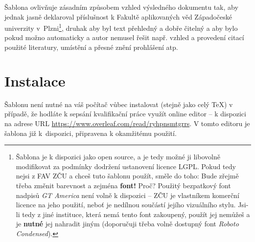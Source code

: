 \documentclass[czech, ing, kiv, he, iso690alph]{fasthesis}
\begin{document}
Šablona ovlivňuje zásadním způsobem vzhled výsledného dokumentu tak, aby jednak jasně deklaroval příslušnost k Fakultě aplikovaných věd Západočeské univerzity v~Plzni\footnote{Šablona je k dispozici jako open source, a je tedy možné ji libovolně modifikovat za podmínky dodržení ustanovení licence LGPL. Pokud tedy nejsi z FAV ZČU a chceš tuto šablonu použít, směle do toho: Bude zřejmě třeba změnit barevnost a zejména \textbf{font!} Proč? Použitý bezpatkový font nadpisů \emph{GT America} není volně k dispozici -- ZČU je vlastníkem komerční licence na jeho použití, neboť je nedílnou součástí jejího vizuálního stylu. Jsi-li tedy z jiné instituce, která nemá tento font zakoupený, použít jej nemůžeš a je \textbf{nutné} jej nahradit jiným (doporučuji třeba volně dostupný font \emph{Roboto Condensed}).}, druhak aby byl text přehledný a dobře čitelný a aby bylo pokud možno  automaticky a autor nemusel řešit např. vzhled a provedení citací použité literatury, umístění a přesné znění prohlášení atp.
%
%
%
\section{Instalace}
Šablonu není nutné  na váš počítač vůbec instalovat (stejně jako celý \TeX) v případě, že hodláte k sepsání kvalifikační práce využít online editor  -- k dispozici na adrese URL \url{https://www.overleaf.com/read/ryhpnsmtgrrs}. V tomto editoru je šablona již k~dispozici, připravena k okamžitému použití.
\end{document}
